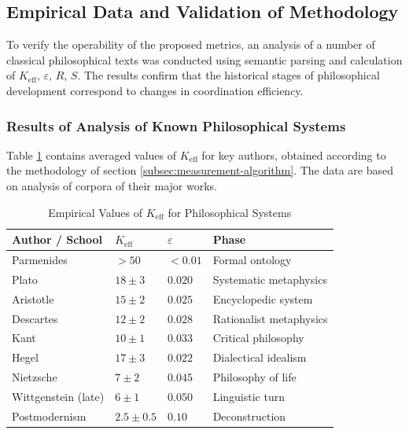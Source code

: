 \documentclass[12pt,a4paper]{article}
\newcommand{\eps}{\varepsilon}
\begin{document}
	\subsection{Empirical Data and Validation of Methodology}
	\label{subsec:empirical-validation}
	
	To verify the operability of the proposed metrics, an analysis of a number of classical philosophical texts was conducted using semantic parsing and calculation of \(K_{\mathrm{eff}}\), \(\eps\), \(R\), \(S\). The results confirm that the historical stages of philosophical development correspond to changes in coordination efficiency.
	
	\subsubsection{Results of Analysis of Known Philosophical Systems}
	
	Table \ref{tab:empirical-keff} contains averaged values of \(K_{\mathrm{eff}}\) for key authors, obtained according to the methodology of section \ref{subsec:measurement-algorithm}. The data are based on analysis of corpora of their major works.
	
	\begin{table}[H]
		\centering
		\caption{Empirical Values of \(K_{\mathrm{eff}}\) for Philosophical Systems}
		\label{tab:empirical-keff}
		\begin{tabular}{p{3cm}p{2cm}p{2.5cm}p{3cm}}
			\toprule
			\textbf{Author / School} & \(K_{\mathrm{eff}}\) & \(\eps\) & \textbf{Phase} \\
			\midrule
			Parmenides & \(>50\) & \(<0.01\) & Formal ontology \\
			Plato & \(18 \pm 3\) & \(0.020\) & Systematic metaphysics \\
			Aristotle & \(15 \pm 2\) & \(0.025\) & Encyclopedic system \\
			Descartes & \(12 \pm 2\) & \(0.028\) & Rationalist metaphysics \\
			Kant & \(10 \pm 1\) & \(0.033\) & Critical philosophy \\
			Hegel & \(17 \pm 3\) & \(0.022\) & Dialectical idealism \\
			Nietzsche & \(7 \pm 2\) & \(0.045\) & Philosophy of life \\
			Wittgenstein (late) & \(6 \pm 1\) & \(0.050\) & Linguistic turn \\
			Postmodernism & \(2.5 \pm 0.5\) & \(0.10\) & Deconstruction \\
			\bottomrule
		\end{tabular}
	\end{table}
	
\end{document}
